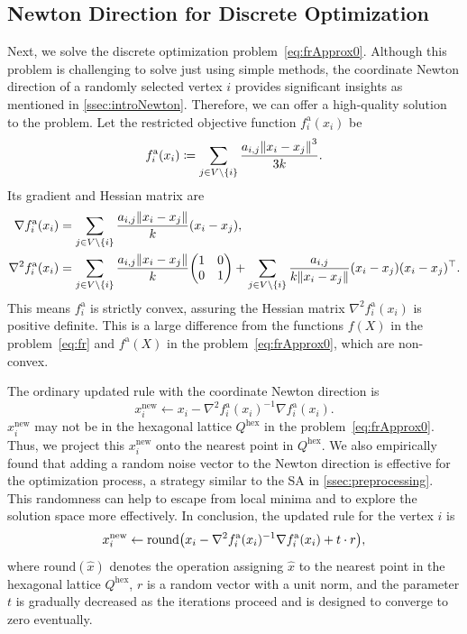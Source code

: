 \documentclass[11pt]{article}
\newcommand{\defeq}{\coloneqq}
\begin{document}
\subsection{Newton Direction for Discrete Optimization}
\label{ssec:newtonDirection}

Next, we solve the discrete optimization problem~\eqref{eq:frApprox0}.
Although this problem is challenging to solve just using simple methods, the coordinate Newton direction of a randomly selected vertex $i$ provides significant insights
as mentioned in \cref{ssec:introNewton}. Therefore, we can offer a high-quality
solution to the problem. Let the restricted objective function
$f^{\mathrm{a}}_{i}(x_{i})$ be
\begin{equation*}
  f^{\mathrm{a}}_{i}(x_{i}) \defeq \sum_{j \in V \setminus \{i\}}\frac{a_{i,j}\norm{x_i - x_j}^{3}}{3k}
  .
\end{equation*}
Its gradient and Hessian matrix are
\begin{align*}
  \nabla f^{\mathrm{a}}_{i}(x_{i})    & = \sum_{j \in V \setminus \{i\}}\frac{a_{i,j}\norm{x_i - x_j}}{k}(x_{i}- x_{j}),                             \\
  \nabla^{2}f^{\mathrm{a}}_{i}(x_{i}) & = \sum_{j \in V \setminus \{i\}}\frac{a_{i,j}\norm{x_i - x_j}}{k}\mqty(1                                 & 0 \\
  0                                   & 1) + \sum_{j \in V \setminus \{i\}}\frac{a_{i,j}}{k\norm{x_i - x_j}}(x_{i}- x_{j})(x_{i}- x_{j})^{\top}.
\end{align*}
This means $f^{\mathrm{a}}_{i}$ is strictly convex, assuring the Hessian matrix
$\nabla^{2}f^{\mathrm{a}}_{i}(x_{i})$ is positive definite. This is a large
difference from the functions $f(X)$ in the problem~\eqref{eq:fr} and $f^{\mathrm{a}}
  (X)$ in the problem~\eqref{eq:frApprox0}, which are non-convex.

The ordinary updated rule with the coordinate Newton direction is
\begin{equation*}
  x_{i}^{\mathrm{new}}\gets x_{i}- \nabla^{2}f^{\mathrm{a}}_{i}(x_{i})^{-1}\nabla
  f^{\mathrm{a}}_{i}(x_{i}).
\end{equation*}
$x_{i}^{\mathrm{new}}$ may not be in the hexagonal lattice $Q^{\mathrm{hex}}$ in
the problem~\eqref{eq:frApprox0}. Thus, we project this $x_{i}^{\mathrm{new}}$
onto the nearest point in $Q^{\mathrm{hex}}$. We also empirically found that adding a random noise vector to the Newton direction is effective for the optimization
process, a strategy similar to the SA in \cref{ssec:preprocessing}. This randomness can help to escape from local minima and to explore the solution space more effectively.
In conclusion, the updated rule for the vertex $i$ is
\begin{equation*}
  x_{i}^{\mathrm{new}}\gets \mathrm{round}\qty(x_{i}- \nabla^{2}f^{\mathrm{a}}_{i}
  (x_{i})^{-1}\nabla f^{\mathrm{a}}_{i}(x_{i}) + t \cdot r),
\end{equation*}
where $\mathrm{round}(\hat{x})$ denotes the operation assigning $\hat{x}$ to the
nearest point in the hexagonal lattice $Q^{\mathrm{hex}}$, $r$ is a random vector with a unit norm, and the parameter $t$ is gradually decreased as the iterations
proceed and is designed to converge to zero eventually.
\end{document}
